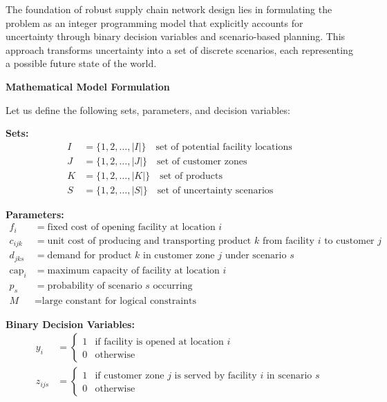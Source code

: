 \documentclass{article}
\begin{document}
The foundation of robust supply chain network design lies in formulating the problem as an integer programming model that explicitly accounts for uncertainty through binary decision variables and scenario-based planning. This approach transforms uncertainty into a set of discrete scenarios, each representing a possible future state of the world.

\textbf{Mathematical Model Formulation}

Let us define the following sets, parameters, and decision variables:

\textbf{Sets:}
\begin{align}
I &= \{1, 2, \ldots, |I|\} \quad \text{set of potential facility locations} \\
J &= \{1, 2, \ldots, |J|\} \quad \text{set of customer zones} \\
K &= \{1, 2, \ldots, |K|\} \quad \text{set of products} \\
S &= \{1, 2, \ldots, |S|\} \quad \text{set of uncertainty scenarios}
\end{align}

\textbf{Parameters:}
\begin{align}
f_i &= \text{fixed cost of opening facility at location } i \\
c_{ijk} &= \text{unit cost of producing and transporting product } k \text{ from facility } i \text{ to customer } j \\
d_{jks} &= \text{demand for product } k \text{ in customer zone } j \text{ under scenario } s \\
\text{cap}_i &= \text{maximum capacity of facility at location } i \\
p_s &= \text{probability of scenario } s \text{ occurring} \\
M &= \text{large constant for logical constraints}
\end{align}

\textbf{Binary Decision Variables:}
\begin{align}
y_i &= \begin{cases} 1 & \text{if facility is opened at location } i \\ 0 & \text{otherwise} \end{cases} \\
z_{ijs} &= \begin{cases} 1 & \text{if customer zone } j \text{ is served by facility } i \text{ in scenario } s \\ 0 & \text{otherwise} \end{cases}
\end{align}
\end{document}
